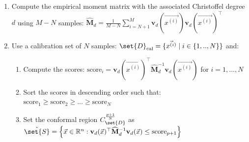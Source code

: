 \documentclass[pmlr]{jmlr}%
\begin{document}
\begin{algorithm2e}
\caption{Reachability analysis with outliers}
\label{alg:Reachability analysis with outliers}


\begin{enumerate}
  \item Compute the empirical moment matrix with the associated Christoffel degree $d$ using $M-N$ samples:
   $ \widehat{\mathbf{M}}_d =\frac{1}{M-N} \sum_{i=N+1}^{M} \mathbf{v}_{d}\left(\Vec{x^{(i)}}\right) \mathbf{v}_{d}\left(\Vec{x^{(i)}}\right)^{\top} $
     \item Use a calibration set of $N$ samples: $\set{D}_\mathrm{cal} = \{ \Vec{x^{(i)}} \mid i \in \{1,..,N\}\}$ and:
      \begin{enumerate}
          \item Compute the  scores: %
          $\text{score}_i = \mathbf{v}_{d}(\Vec{x^{(i)}})^{\top} {\widehat{\mathbf{M}}}^{-1}_d  \mathbf{v}_{d}(\Vec{x^{(i)}})$ for $i=1,\ldots,N$
          \item Sort the scores in descending order such that: $\text{score}_1 \geq \text{score}_2 \geq ... \geq \text{score}_N $
          \item  Set the conformal region $C_{\set{D}}^{\frac{p+1}{N}}$ as $ \hat{\set{S}}  = \left\{\Vec{x} \in \mathbb{R}^{n}: \mathbf{v}_{d}(\Vec{x})^{\top} {\widehat{\mathbf{M}}}^{-1}_d  \mathbf{v}_{d}(\Vec{x}) \leq \text{score}_{p+1}  \right\}   $
      \end{enumerate}
       
     
  
\end{enumerate}




\end{algorithm2e}
\end{document}
